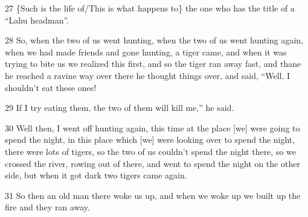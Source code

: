 27 \{Such is the life of/This is what happens to\} the one who has the title of
a ``Lahu headman''.

28 So, when the two of us went hunting, when the two of us went hunting again,
when we had made friends and gone hunting, a tiger came, and when it was trying
to bite us we realized this first, and so the tiger ran away fast, and thane he
reached a ravine way over there he thought things over, and said, ``Well, I shouldn't
eat these ones!

29 If I try eating them, the two of them will kill me,'' he said.

30 Well then, I went off hunting again, this time at the place [we] were going
to spend the night, in this place which [we] were looking over to spend the night,
there were lots of tigers, so the two of us couldn't spend the night there, so
we crossed the river, rowing out of there, and went to spend the night on the other
side, but when it got dark two tigers came again.

31 So then an old man there woke us up, and when we woke up we built up the fire
and they ran away.

